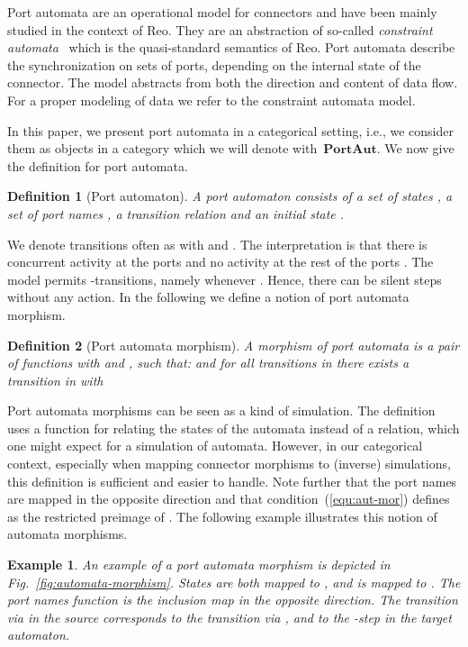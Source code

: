 \documentclass[copyright,creativecommons]{eptcs}
\newtheorem{definition}{Definition}
\newtheorem{example}{Example}
\newcommand{\PA}{\ensuremath{\mathbf{PortAut}}}
\begin{document}
Port automata are an operational model for connectors
and have been mainly studied in the context of Reo.
They are an abstraction of so-called \emph{constraint automata}~\cite{BSAR06}
which is the quasi-standard semantics of Reo.
Port automata describe the synchronization on sets
of ports, depending on the internal state of the connector.
The model abstracts from both the direction and content
of data flow. For a proper modeling of data we refer to the
constraint automata model.

In this paper, we present port automata
in a categorical setting, i.e., we consider
them as objects in a category which we will denote with~\PA.
We now give the definition for port automata.
\vspace{0.2cm}
\begin{definition}[Port automaton] 
A port automaton  consists of a set of states , 
a set of port names , a transition relation  and an initial state .
\end{definition}
We denote transitions often as 
with  and . 
The interpretation is that there is concurrent activity
at the ports  and no activity at the rest of the ports . 
The model permits -transitions, namely whenever . Hence,
there can be silent steps without any action. In the following we define
a notion of port automata morphism.
\vspace{0.2cm}
\begin{definition}[Port automata morphism]
A morphism of port automata  is a pair of functions 
with  and , such that: 
 and 
for all transitions  in 
there exists a transition  in  with

\end{definition}

\vfill

Port automata morphisms can be seen as a kind of simulation.
The definition uses
a function for relating the states of the automata instead of a relation, which
one might expect for a simulation of automata. However, in our categorical
context, especially when mapping connector morphisms to (inverse) simulations,
this definition is sufficient and easier to handle.
Note further that the port names are mapped in the opposite direction and
that condition~(\ref{equ:aut-mor}) defines  as the restricted preimage of
. The following example illustrates this notion of automata morphisms.

\vfill

\begin{example}
An example of a port automata morphism is depicted in
Fig.~\ref{fig:automata-morphism}. States  are both mapped to , and
 is mapped to . The port names function is the inclusion map in the
opposite direction. The transition via  in the source corresponds
to the transition via , and  to
the -step in the target automaton.
\end{example}
\end{document}
